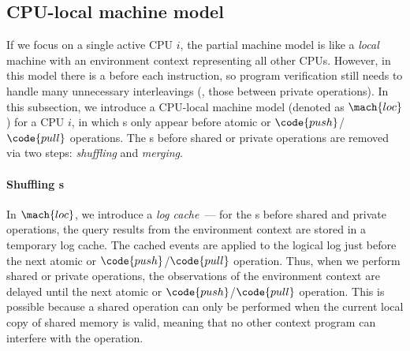 \subsection{CPU-local machine model}
\label{ssec:spec:seq}

If we focus on a single active CPU $i$,
the partial machine model is like a \emph{local} machine
with an environment context representing all other CPUs. However,
in this model there is a {\intptext} before each instruction,
so program verification still needs to handle many unnecessary 
interleavings (\eg, those between private operations).
In this subsection, we introduce a CPU-local
machine model (denoted as $\mach{loc}$) for a CPU $i$, in which {\intptext}s
only appear before atomic or $\code{push}$/$\code{pull}$ operations.
The {\intptext}s before shared or private operations
are removed via two steps: \emph{shuffling} and \emph{merging}.

\vspace*{-10pt}
\paragraph{Shuffling {\intptext}s}
In $\mach{loc}$, we introduce a \emph{log cache}~--- for
the {\intptext}s before shared and private operations,
the query results from the environment context
are stored in a temporary log cache.
The cached events are applied to the logical log
just before the next atomic or $\code{push}$/$\code{pull}$ operation.
Thus, when we perform shared or private operations,
the observations of the environment context are delayed
until the next atomic or $\code{push}$/$\code{pull}$ operation.
This is possible because a shared operation can only be performed
when the current local copy of shared memory is valid, meaning that 
no other context program can interfere with the operation.

\vspace*{-10pt}
